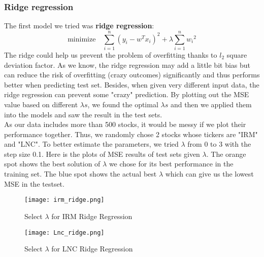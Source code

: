 \documentclass[fleqn,10pt]{SelfArx} %
\begin{document}
\subsubsection{Ridge regression}
The first model we tried was \textbf{ridge regression}:
$$ \text{minimize} \quad \sum_{i=1}^{n} (y_i - w^Tx_i)^2 + \lambda \sum_{i=1}^{n} {w_i}^2$$
The ridge could help us prevent the problem of overfitting thanks to $l_2 $ square deviation factor. As we know, the ridge regression may add a little bit bias but can reduce the risk of overfitting (crazy outcomes) significantly and thus performs better when predicting test set. Besides, when given very different input data, the ridge regression can prevent some "crazy" prediction. By plotting out the MSE value based on different $\lambda s$, we found the optimal $\lambda s$ and then we applied them into the models and saw the result in the test sets. \\
\newline
\noindent
As our data includes more than 500 stocks, it would be messy if we plot their performance together. Thus, we randomly chose 2 stocks whose tickers are "IRM" and "LNC". To better estimate the parameters, we tried $\lambda$ from 0 to 3 with the step size 0.1. Here is the plots of MSE results of test sets given $\lambda$. The orange spot shows the best solution of $\lambda$ we chose for its best performance in the training set. The blue spot shows the actual best $\lambda$ which can give us the lowest MSE in the testset. \\

\begin{figure}[ht]\centering %
\texttt{[image: irm\_ridge.png]}
\caption{Select $\lambda$ for IRM Ridge Regression}
\label{fig:view}
\end{figure}

\begin{figure}[ht]\centering %
\texttt{[image: Lnc\_ridge.png]}
\caption{Select $\lambda$ for LNC Ridge Regression}
\label{fig:view}
\end{figure}
\end{document}
